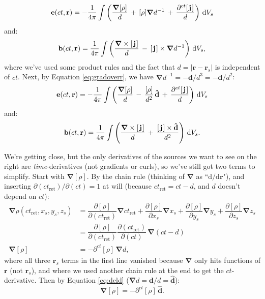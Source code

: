 \documentclass[12pt]{article}
\renewcommand{\vv}[1]{\mathbf{#1}}
\newcommand{\dd}[1]{\mathrm{d}#1}
\newcommand{\del}{\boldsymbol{\nabla}}
\begin{document}
\begin{equation*}
\vv e(ct, \vv r) = - \dfrac{1}{4 \pi} \int \left( \dfrac{\del [ \rho ]}{d} \, + \, [\rho] \del d^{-1}  \, +  \, \dfrac{ \partial^{ct} [\mkern2mu \vv j \mkern1.5mu ]}{d} \right) \, \dd V_{s}
\end{equation*}
and:
\begin{equation*}
\vv b(ct, \vv r) = \dfrac{1}{4 \pi} \int \left( \dfrac{ \del \times [\mkern2mu \vv j \mkern1.5mu ] }{d} \, - \, [\mkern2mu \vv j \mkern1.5mu ] \times \del d^{-1} \right) \, \dd V_{s} ,
\end{equation*}
where we've used some product rules and the fact that $d = \vert \vv r - \vv r_{s} \vert$ is independent of $ct$. Next, by Equation \ref{eq:gradoverr}, we have $\del d^{-1} = - \vv d / d^3 = - \vv{\hat{d}} / d^2$:
\begin{equation}\label{eq:ref1}
\vv e(ct, \vv r) = - \dfrac{1}{4 \pi} \int \left( \dfrac{\del [ \rho ]}{d} \, - \, \dfrac{[\rho]}{d^2} \, \vv{\hat{d}}  \, +  \, \dfrac{ \partial^{ct} [\mkern2mu \vv j \mkern1.5mu ]}{d} \right) \, \dd V_{s}
\end{equation}
and:
\begin{equation}\label{eq:rbf1}
\vv b(ct, \vv r) = \dfrac{1}{4 \pi} \int \left( \dfrac{ \del \times [\mkern2mu \vv j \mkern1.5mu ] }{d} \, + \, \dfrac{[\mkern2mu \vv j \mkern1.5mu ] \times \vv{\hat{d}}}{d^2} \right) \, \dd V_{s} .
\end{equation}

We're getting close, but the only derivatives of the sources we want to see on the right are \emph{time}-derivatives (not gradients or curls), so we've still got two terms to simplify. Start with $\del [\rho]$. By the chain rule (thinking of $\del$ as ``$\dd / \dd \vv r$"), and inserting $\partial(ct_{\mathrm{ret}})/\partial(ct) = 1$ at will (because $ct_{\mathrm{ret}} = ct - d$, and $d$ doesn't depend on $ct$):
\begin{equation*}
\begin{aligned}
\del \rho (ct_{\textrm{ret}}, x_{s}, y_{s}, z_{s}) &= \dfrac{\partial [\rho]}{\partial (ct_{\mathrm{ret}})} \del ct_{\mathrm{ret}} + \dfrac{\partial [\rho]}{\partial x_{s}} \del x_{s} + \dfrac{\partial [\rho]}{\partial y_{s}} \del y_{s} + \dfrac{\partial [\rho]}{\partial z_{s}} \del z_{s} \\[4pt]
&=  \dfrac{\partial [\rho] }{\partial (ct_{\mathrm{ret}})} \dfrac{\partial (ct_{\mathrm{ret}})}{\partial (ct)} \, \del (ct - d) \\[4pt]
\del [\rho] &= - \partial^{ct} [\rho] \, \del d ,
\end{aligned}
\end{equation*}
where all three $\vv r_{s}$ terms in the first line vanished because $\del$ only hits functions of $\vv r$ (not $\vv r_{s}$), and where we used another chain rule at the end to get the $ct$-derivative. Then by Equation \ref{eq:deld} ($\del d = \vv d / d = \vv{\hat{d}}$):
\begin{equation}\label{eq:delrho}
\del [\rho] = - \partial^{ct} [\rho] \, \vv{\hat{d}} .
\end{equation}
\end{document}

